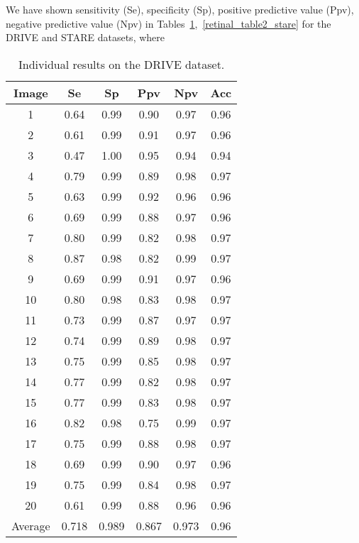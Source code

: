 \documentclass[12pt]{article}
\begin{document}
We have shown sensitivity (Se), specificity (Sp), positive predictive value (Ppv), negative predictive value (Npv) in Tables~\ref{retinal_table2_drive},~\ref{retinal_table2_stare} for the DRIVE and STARE datasets, where





\begin{table}[h]
    \centering
    \caption{Individual results on the DRIVE dataset.}
    \label{retinal_table2_drive}
    \begin{tabular}{c|c|c|c|c|c}
     \toprule
    Image& Se &Sp &Ppv &Npv &Acc \\
    \toprule
1 & 0.64 &  0.99  & 0.90 & 0.97 & 0.96  \\
2 & 0.61 &  0.99  & 0.91 & 0.97 & 0.96  \\
3 & 0.47 &  1.00  & 0.95 & 0.94 & 0.94  \\
4 & 0.79 &  0.99  & 0.89 & 0.98 & 0.97  \\
5 & 0.63 &  0.99  & 0.92 & 0.96 & 0.96  \\
6 & 0.69 &  0.99  & 0.88 & 0.97 & 0.96  \\
7 & 0.80 &  0.99  & 0.82 & 0.98 & 0.97  \\
8 & 0.87 &  0.98  & 0.82 & 0.99 & 0.97  \\
9 & 0.69 &  0.99  & 0.91 & 0.97 & 0.96  \\
10 & 0.80 &  0.98  & 0.83 & 0.98 & 0.97  \\
11 & 0.73 &  0.99  & 0.87 & 0.97 & 0.97  \\
12 & 0.74 &  0.99  & 0.89 & 0.98 & 0.97  \\
13 & 0.75 &  0.99  & 0.85 & 0.98 & 0.97  \\
14 & 0.77 &  0.99  & 0.82 & 0.98 & 0.97  \\
15 & 0.77 &  0.99  & 0.83 & 0.98 & 0.97  \\
16 & 0.82 &  0.98  & 0.75 & 0.99 & 0.97  \\
17 & 0.75 &  0.99  & 0.88 & 0.98 & 0.97  \\
18 & 0.69 &  0.99  & 0.90 & 0.97 & 0.96  \\
19 & 0.75 &  0.99  & 0.84 & 0.98 & 0.97  \\
20 & 0.61 &  0.99  & 0.88 & 0.96 & 0.96  \\
\midrule
Average & 0.718& 0.989& 0.867 & 0.973 &0.96 \\
    \bottomrule
    \end{tabular}
\end{table}
\end{document}
